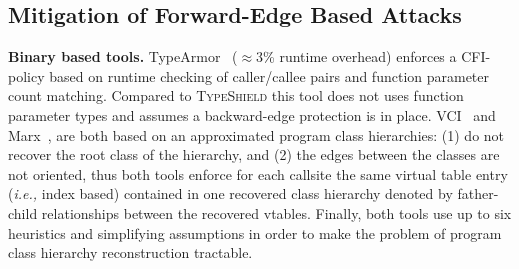 \subsection{Mitigation of Forward-Edge Based Attacks}
\label{C++ Indirect Calls in Practice}
\textbf{Binary based tools.} TypeArmor~\cite{veen:typearmor}
($\approx$3\% runtime overhead) enforces a CFI-policy based on runtime checking of caller/callee pairs 
and function parameter count matching. Compared to \textsc{TypeShield} this tool does not uses function 
parameter types and assumes a backward-edge protection is in place.
VCI~\cite{vci:asiaccs} and Marx~\cite{marx}, are both based on an approximated program class hierarchies: 
(1) do not recover the root class of the hierarchy, and (2) the edges between the classes are not oriented, thus both tools 
enforce for each callsite the same virtual table entry (\textit{i.e.,} index based) 
contained in one recovered class hierarchy denoted by father-child relationships between the recovered vtables. 
Finally, both tools use up to six heuristics and simplifying assumptions in order to make the problem of program
class hierarchy reconstruction tractable.

